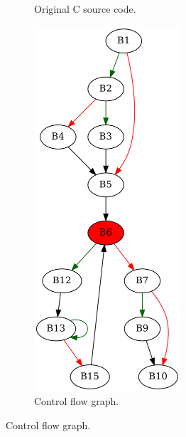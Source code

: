 \begin{figure}[htbp]
	\centering
	\begin{subfigure}[b]{0.30\textwidth}
		\centering
		
		\caption{Original C source code.}
	\end{subfigure}
	\begin{subfigure}[b]{0.50\textwidth}
		\centering
		\includegraphics[width=0.6\textwidth]{inc/appendices/examples/interval/example/sample/f_0003b.png}
		\caption{Control flow graph.}
	\end{subfigure}
\end{figure}

